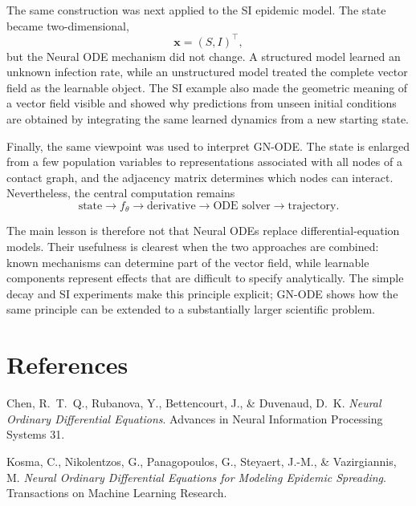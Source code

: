 \documentclass[11pt,a4paper]{article}
\begin{document}
The same construction was next applied to the SI epidemic model. The state
became two-dimensional,
\[
    \mathbf{x}=(S,I)^\top,
\]
but the Neural ODE mechanism did not change. A structured model learned an
unknown infection rate, while an unstructured model treated the complete
vector field as the learnable object. The SI example also made the geometric
meaning of a vector field visible and showed why predictions from unseen
initial conditions are obtained by integrating the same learned dynamics from
a new starting state.

Finally, the same viewpoint was used to interpret GN-ODE. The state is enlarged
from a few population variables to representations associated with all nodes
of a contact graph, and the adjacency matrix determines which nodes can
interact. Nevertheless, the central computation remains
\[
    \text{state}
    \rightarrow
    f_\theta
    \rightarrow
    \text{derivative}
    \rightarrow
    \text{ODE solver}
    \rightarrow
    \text{trajectory}.
\]

The main lesson is therefore not that Neural ODEs replace differential-equation
models. Their usefulness is clearest when the two approaches are combined:
known mechanisms can determine part of the vector field, while learnable
components represent effects that are difficult to specify analytically. The
simple decay and SI experiments make this principle explicit; GN-ODE shows how
the same principle can be extended to a substantially larger scientific
problem.


\section{References}

{\small
\begin{description}[leftmargin=*,itemsep=2pt]

\item[Chen et al.\ (2018)]
Chen, R.\ T.\ Q., Rubanova, Y., Bettencourt, J., \& Duvenaud, D.\ K.
\emph{Neural Ordinary Differential Equations}.
Advances in Neural Information Processing Systems 31.

\item[Kosma et al.\ (2023)]
Kosma, C., Nikolentzos, G., Panagopoulos, G., Steyaert, J.-M., \&
Vazirgiannis, M.
\emph{Neural Ordinary Differential Equations for Modeling Epidemic Spreading}.
Transactions on Machine Learning Research.

\end{description}
}
\end{document}
